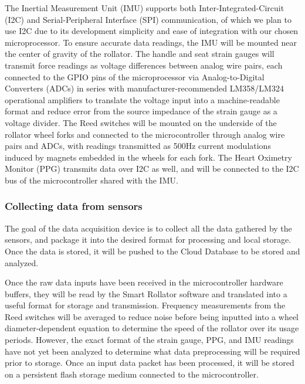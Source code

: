 \documentclass{article}
\begin{document}
The Inertial Measurement Unit (IMU) supports both Inter-Integrated-Circuit (I2C) and Serial-Peripheral Interface (SPI) communication, of which we plan to use I2C due to its development simplicity and ease of integration with our chosen microprocessor. To ensure accurate data readings, the IMU will be mounted near the center of gravity of the rollator. 
The handle and seat strain gauges will transmit force readings as voltage differences between analog wire pairs, each connected to the GPIO pins of the microprocessor via Analog-to-Digital Converters (ADCs) in series with manufacturer-recommended LM358/LM324 operational amplifiers to translate the voltage input into a machine-readable format and reduce error from  the source impedance of the strain gauge as a voltage divider. 
The Reed switches will be mounted on the underside of the rollator wheel forks and connected to the microcontroller through analog wire pairs and ADCs, with readings transmitted as 500Hz current modulations induced by magnets embedded in the wheels for each fork. The Heart Oximetry Monitor (PPG) transmits data over I2C as well, and will be connected to the I2C bus of the microcontroller shared with the IMU.

\subsubsection{Collecting data from sensors}
The goal of the data acquisition device is to collect all the data gathered by the sensors, and package it into the desired format for processing and local storage. Once the data is stored, it will be pushed to the Cloud Database to be stored and analyzed.

Once the raw data inputs have been received in the microcontroller hardware buffers, they will be read by the Smart Rollator software and translated into a useful format for storage and transmission. Frequency measurements from the Reed switches will be averaged to reduce noise before being inputted into a wheel diameter-dependent equation to determine the speed of the rollator over its usage periods. However, the exact format of the strain gauge, PPG, and IMU readings have not yet been analyzed to determine what data preprocessing will be required prior to storage. Once an input data packet has been processed, it will be stored on a persistent flash storage medium connected to the microcontroller.
\end{document}
